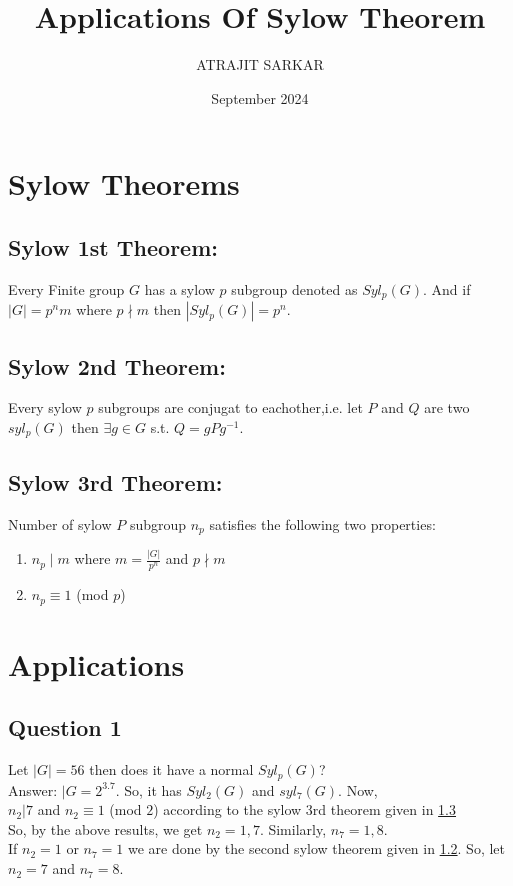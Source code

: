 \documentclass{article}
\title{Applications Of Sylow Theorem}
\author{ATRAJIT SARKAR}
\date{September 2024}
\begin{document}
\maketitle
\tableofcontents

\section{Sylow Theorems}
\label{sec:sylow theorems}
\subsection{Sylow 1st Theorem:}
\label{subsec:sylow 1st thm}
Every Finite group $G$ has a sylow $p$ subgroup denoted as $Syl_p(G)$. And if $|G|=p^nm$ where
$p \nmid m$ then $|Syl_p(G)|=p^n$.

\subsection{Sylow 2nd Theorem:}
\label{subsec: sylow 2nd thm}
Every sylow $p$ subgroups are conjugat to eachother,i.e. let $P$ and $Q$ are two $syl_p(G)$ then $\exists g\in G$ s.t. $Q=gPg^{-1}$.

\subsection{Sylow 3rd Theorem:}
\label{subsec:sylow 3rd thm}
Number of sylow $P$ subgroup $n_p$ satisfies the following two properties:
\begin{enumerate}
    
    \item $n_p \mid m$ where $m=\frac{|G|}{p^n}$ and $p \nmid m$
    \item $n_p \equiv 1$ (mod $p$)
\end{enumerate}

\section{Applications}
\label{sec:application}
\subsection{Question 1}
\label{subsec:q1}
Let $|G|=56$ then does it have a normal $Syl_p(G)$?\\

Answer: $|G=2^3.7$. So, it has $Syl_2(G)$ and $syl_7(G)$. Now,\\
$n_2|7$ and $n_2 \equiv 1$ (mod $2$) according to the sylow 3rd theorem given in \cref{subsec:sylow 3rd thm}\\
So, by the above results, we get $n_2=1,7$.
Similarly, $n_7=1,8$.\\
If $n_2=1$ or $n_7=1$ we are done by the second sylow theorem given in \cref{subsec: sylow 2nd thm}. So, let $n_2=7$ and $n_7=8$.\\
\end{document}
